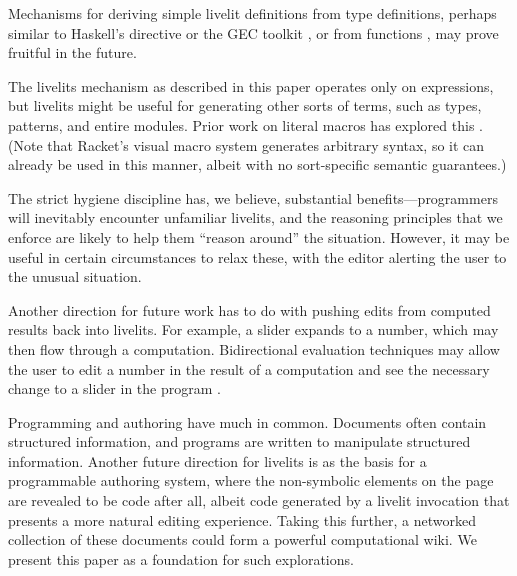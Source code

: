 Mechanisms for deriving simple 
livelit definitions from type definitions, perhaps similar to Haskell's  directive
or the GEC toolkit \cite{DBLP:conf/afp/AchtenEPW04}, or from  functions \cite{DBLP:conf/vl/HempelC20}, 
may prove fruitful in the future.

  The livelits mechanism as described in this paper operates only on expressions,
  but livelits might be useful for generating other sorts of terms, such as types,
  patterns, and entire modules. Prior work on literal macros has explored this \cite{TLMs}.
  (Note that Racket's visual macro system generates
  arbitrary syntax, so it can already be used in 
  this manner, albeit with no sort-specific semantic guarantees.)

   The strict hygiene discipline has, we believe, substantial 
   benefits---programmers will inevitably encounter unfamiliar livelits, and 
   the reasoning principles that we enforce are likely to help them ``reason around''
   the situation. However, it may be useful in certain circumstances to 
   relax these, with the editor alerting the user to the unusual situation.

  Another direction for future work has to do with pushing edits from computed results
  back into livelits. For example, a slider expands to a number, which may 
  then flow through a computation. Bidirectional evaluation techniques may allow
  the user to edit a number in the result of a computation and see the necessary
  change to a slider in the program \cite{sns-pldi,sns-uist}.

  Programming and authoring have much in common. Documents often contain structured
  information, and programs are written to manipulate structured information.
  Another future direction for livelits is as the basis for a programmable authoring 
  system, where the non-symbolic elements on the page are revealed to be code after all,
  albeit code generated by a livelit invocation that presents a more natural editing experience. 
  Taking this further, a networked collection of these
  documents could form a powerful computational wiki.
  We present this paper as a foundation for such explorations.

